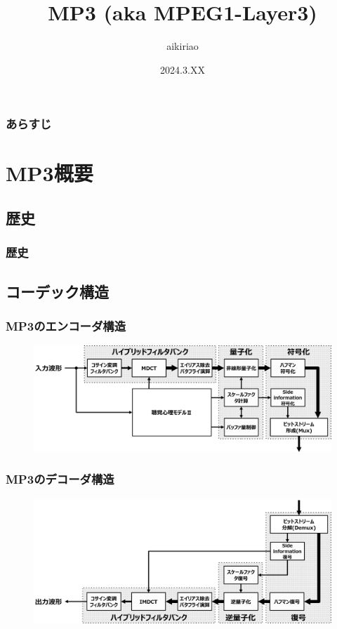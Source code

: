 \documentclass[17pt,xcolor=dvipsnames,table,dvipdfmx]{beamer}
\title{MP3 (aka MPEG1-Layer3)}
\author[aikiriao]{aikiriao}
\date{2024.3.XX}
\begin{document}
\maketitle

\begin{frame}[c]
    \frametitle{あらすじ}
    \tableofcontents
\end{frame}

\section{MP3概要}

\subsection{歴史}

\begin{frame}[c]
    \frametitle{歴史}
\end{frame}

\subsection{コーデック構造}

\begin{frame}[c]
    \frametitle{MP3のエンコーダ構造}
    \begin{figure}
        \includegraphics[width=115mm]{./figs/mp3_encoder_struct.png}
    \end{figure}
\end{frame}

\begin{frame}[c]
    \frametitle{MP3のデコーダ構造}
    \begin{figure}
        \includegraphics[width=115mm]{./figs/mp3_decoder_struct.png}
    \end{figure}
\end{frame}
\end{document}
